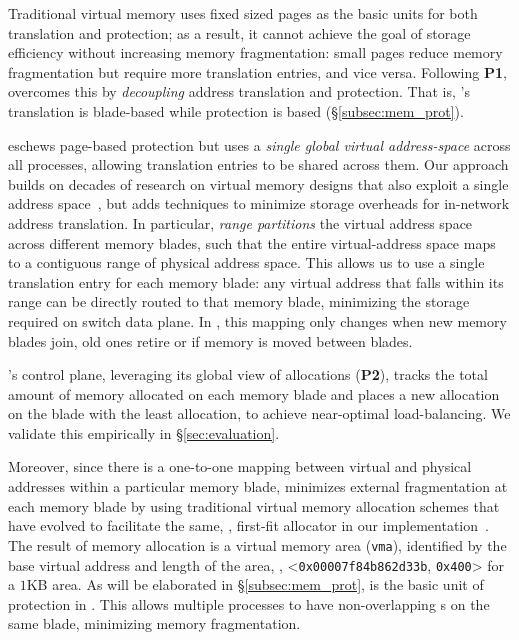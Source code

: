 Traditional virtual memory uses fixed sized pages as the basic units for both translation and protection; as a result, it cannot achieve the goal of storage efficiency without increasing memory fragmentation: small pages reduce memory fragmentation but require more translation entries, and vice versa.  Following \textbf{P1}, \mind overcomes this by \textit{decoupling} address translation and protection.  That is, \mind's translation is blade-based while protection is  based (\S\ref{subsec:mem_prot}).

 \mind eschews page-based protection but uses a \textit{single global virtual address-space} across all processes, allowing translation entries to be shared across them. Our approach builds on decades of research on virtual memory designs that also exploit a single address space~\cite{cheri, cap, gam, grappa, opal}, but adds techniques to minimize storage overheads for in-network address translation.
In particular, \mind \textit{range partitions} the virtual address space across different memory blades, such that the entire virtual-address space maps to a contiguous range of physical address space. This allows us to use a single translation entry for each memory blade: any virtual address that falls within its range can be directly routed to that memory blade, minimizing the storage required on switch data plane. In \mind, this mapping only changes when new memory blades join, old ones retire or if memory is moved between blades.

 \mind's control plane, leveraging its global view of allocations (\textbf{P2}), tracks the total amount of memory allocated on each memory blade and places a new allocation on the blade with the least allocation, to achieve near-optimal load-balancing. We validate this empirically in \S\ref{sec:evaluation}.

Moreover, since there is a one-to-one mapping between virtual and physical addresses within a particular memory blade, \mind minimizes external fragmentation at each memory blade by using traditional virtual memory allocation schemes that have evolved to facilitate the same, \eg, first-fit allocator in our implementation~\cite{firstfit}.
The result of memory allocation is a virtual memory area (\texttt{vma}), identified by the base virtual address and length of the area, \eg, 
  {{\small <\texttt{0x00007f84b862d33b}, \texttt{0x400}>}}
for a $1$KB area. 
As will be elaborated in \S\ref{subsec:mem_prot},  is the basic unit of protection in \mind.
This allows multiple processes to have non-overlapping s on the same blade, minimizing memory fragmentation.
 
